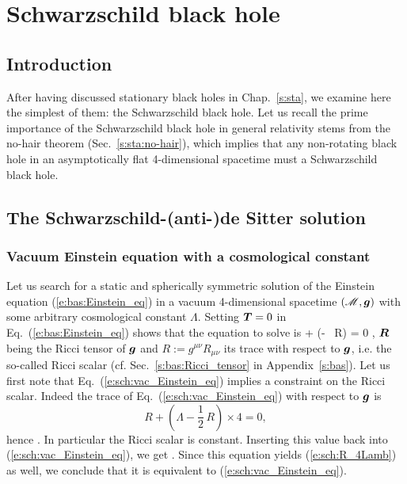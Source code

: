 \chapter{Schwarzschild black hole}
\label{s:sch}

\minitoc

\section{Introduction}

After having discussed stationary black holes in Chap.~\ref{s:sta},
we examine here the simplest of them: the Schwarzschild black hole.
Let us recall the prime importance of the Schwarzschild black hole
in general relativity stems from the no-hair theorem (Sec.~\ref{s:sta:no-hair}),
which implies that any non-rotating black hole in an asymptotically flat
4-dimensional spacetime must a Schwarzschild black hole.

\section{The Schwarzschild-(anti-)de Sitter solution}

\subsection{Vacuum Einstein equation with a cosmological constant}

Let us search for a static and spherically symmetric solution of the
Einstein equation (\ref{e:bas:Einstein_eq}) in a vacuum
4-dimensional spacetime $(\mathscr{M},\bm{g})$ with some arbitrary cosmological constant
$\Lambda$. Setting $\bm{T}=0$ in Eq.~(\ref{e:bas:Einstein_eq}) shows
that the equation to solve is
\be \label{e:sch:vac_Einstein_eq}
      + \left(\Lambda - \, R\right)  = 0 ,
\ee
$\bm{R}$ being the Ricci tensor of $\bm{g}$ and $R:=g^{\mu\nu} R_{\mu\nu}$ its
trace with respect to $\bm{g}$, i.e. the so-called Ricci scalar
(cf. Sec.~\ref{s:bas:Ricci_tensor} in Appendix~\ref{s:bas}).
Let us first note that Eq.~(\ref{e:sch:vac_Einstein_eq}) implies a
constraint on the Ricci scalar. Indeed the trace of Eq.~(\ref{e:sch:vac_Einstein_eq})
with respect to $\bm{g}$ is
\[
    R + \left(\Lambda - \frac{1}{2}\, R\right) \times 4 = 0 ,
\]
hence
\be \label{e:sch:R_4Lamb}
     .
\ee
In particular the Ricci scalar is constant.
Inserting this value back into (\ref{e:sch:vac_Einstein_eq}), we get
\be \label{e:sch:vac_Einstein_eq_Lamb}
     .
\ee
Since this equation yields (\ref{e:sch:R_4Lamb}) as well, we conclude
that it is equivalent to (\ref{e:sch:vac_Einstein_eq}).

